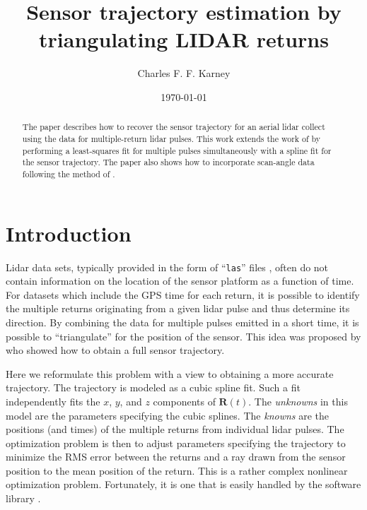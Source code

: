 \documentclass
[rmp,reprint,
twocolumn,amsmath,showkeys,letterpaper,raggedbottom]{revtex4-2}
\begin{document}
\title{Sensor trajectory estimation by triangulating LIDAR returns}
\date{\today}
\author{Charles F. F. Karney}

\begin{abstract}

The paper describes how to recover the sensor trajectory for an aerial
lidar collect using the data for multiple-return lidar pulses.  This
work extends the work of \citet{gatziolis19} by performing a
least-squares fit for multiple pulses simultaneously with a spline fit
for the sensor trajectory.  The paper also shows how to incorporate
scan-angle data following the method of \citet{hartzell20}.

\end{abstract}

\maketitle

\section{Introduction}\label{intro}

Lidar data sets, typically provided in the form of ``{\tt las}'' files
\citep{las}, often do not contain information on the location of the
sensor platform as a function of time.  For datasets which include the
GPS time for each return, it is possible to identify the multiple
returns originating from a given lidar pulse and thus determine its
direction.  By combining the data for multiple pulses emitted in a short
time, it is possible to ``triangulate'' for the position of the sensor.
This idea was proposed by \citet{gatziolis19} who showed how to obtain a
full sensor trajectory.

Here we reformulate this problem with a view to obtaining a more
accurate trajectory.  The trajectory is modeled as a cubic spline fit.
Such a fit independently fits the $x$, $y$, and $z$ components
of $\mathbf R(t)$.  The {\it unknowns} in this model are the parameters
specifying the cubic splines.  The {\it knowns} are the positions (and
times) of the multiple returns from individual lidar pulses.  The
optimization problem is then to adjust parameters specifying the
trajectory to minimize the RMS error between the returns and a ray
drawn from the sensor position to the mean position of the return.
This is a rather complex nonlinear optimization problem.  Fortunately,
it is one that is easily handled by the software library \citet{ceres}.
\end{document}
